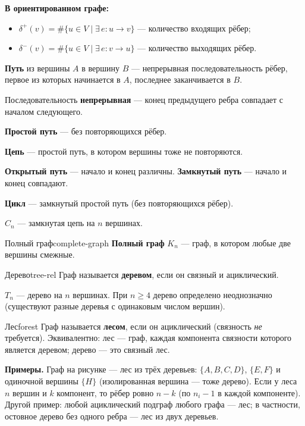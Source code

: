 \medskip
\textbf{В ориентированном графе:}
\begin{itemize}
  \item $\delta^+(v) = \#\bigl\{u \in V \;\big|\; \exists\, e\colon u \to v\bigr\}$
        --- количество входящих рёбер;
  \item $\delta^-(v) = \#\bigl\{u \in V \;\big|\; \exists\, e\colon v \to u\bigr\}$
        --- количество выходящих рёбер.
\end{itemize}

\bigskip
\textbf{Путь} из вершины $A$ в вершину $B$ --- непрерывная последовательность рёбер,
первое из которых начинается в $A$, последнее заканчивается в $B$.

Последовательность \textbf{непрерывная} --- конец предыдущего ребра совпадает
с началом следующего.

\textbf{Простой путь} --- без повторяющихся рёбер.

\textbf{Цепь} --- простой путь, в котором вершины тоже не повторяются.

\textbf{Открытый путь} --- начало и конец различны.
\textbf{Замкнутый путь} --- начало и конец совпадают.

\textbf{Цикл} --- замкнутый простой путь (без повторяющихся рёбер).

$C_n$ --- замкнутая цепь на $n$ вершинах.

\bigskip
\begin{defn}{Полный граф}{complete-graph}
\textbf{Полный граф} $K_n$ --- граф, в котором любые две вершины смежные.
\end{defn}

\begin{defn}{Дерево}{tree-rel}
Граф называется \textbf{деревом}, если он связный и ациклический.
\end{defn}

$T_n$ --- дерево на $n$ вершинах. При $n \geq 4$ дерево определено неоднозначно
(существуют разные деревья с одинаковым числом вершин).

\begin{defn}{Лес}{forest}
Граф называется \textbf{лесом}, если он ациклический (связность
\emph{не} требуется). Эквивалентно: лес --- граф, каждая компонента
связности которого является деревом; дерево --- это связный лес.
\end{defn}


\textbf{Примеры.} Граф на рисунке --- лес из трёх деревьев:
$\{A, B, C, D\}$, $\{E, F\}$ и одиночной вершины $\{H\}$ (изолированная
вершина --- тоже дерево). Если у леса $n$ вершин и $k$ компонент, то
рёбер ровно $n - k$ (по $n_i - 1$ в каждой компоненте). Другой пример:
любой ациклический подграф любого графа --- лес; в частности, остовное
дерево без одного ребра --- лес из двух деревьев.

